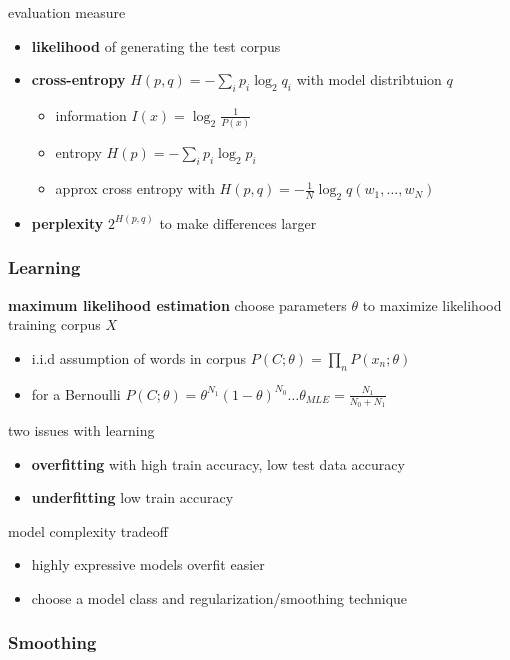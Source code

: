 \documentclass[]{article}
\theoremstyle{definition}
\begin{document}
evaluation measure
\begin{itemize}
    \item \textbf{likelihood} of generating the test corpus
    \item \textbf{cross-entropy} $H(p, q) = - \sum_i p_i \log_2 q_i$ with model distribtuion $q$
        \begin{itemize}
            \item information $I(x) = \log_2 \frac{1}{P(x)}$
            \item entropy $H(p) = -\sum_i p_i \log_2 p_i$
            \item approx cross entropy with $H(p,q) = -\frac{1}{N} \log_2 q(w_1,\ldots, w_N)$
        \end{itemize}
    \item \textbf{perplexity} $2^{H(p,q)}$ to make differences larger
\end{itemize}


\subsubsection{Learning}%
\label{ssub:learning}


\textbf{maximum likelihood estimation} choose parameters $\theta$ to maximize likelihood training corpus $X$
\begin{itemize}
    \item i.i.d assumption of words in corpus $P(C;\theta) = \prod_n P(x_n;\theta)$
    \item for a Bernoulli $P(C;\theta) = \theta^{N_1}(1-\theta)^{N_0} \ldots \theta_{MLE} = \frac{N_1}{N_0 + N_1}$
\end{itemize}

two issues with learning
\begin{itemize}
    \item \textbf{overfitting} with high train accuracy, low test data accuracy
    \item \textbf{underfitting} low train accuracy
\end{itemize}

model complexity tradeoff
\begin{itemize}
    \item highly expressive models overfit easier
    \item choose a model class and regularization/smoothing technique
\end{itemize}


\subsubsection{Smoothing}%
\label{ssub:smoothing}
\end{document}
